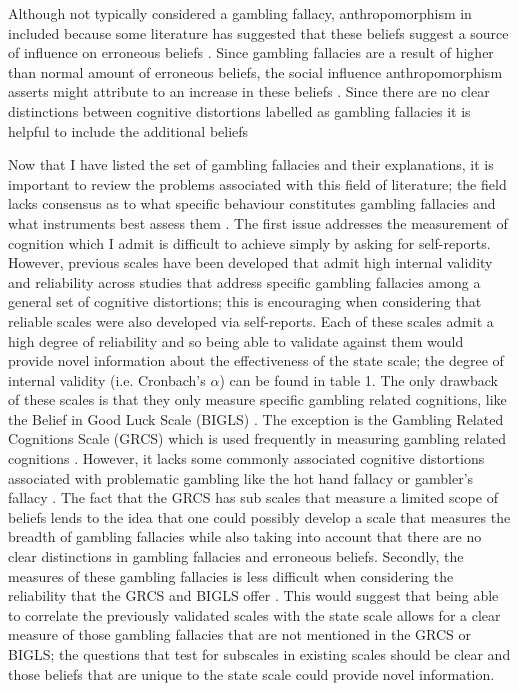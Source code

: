 \documentclass[twoside,twocolumn]{article}
\begin{document}
Although not typically considered a gambling fallacy, anthropomorphism in included because some literature has suggested that these beliefs suggest a source of influence on erroneous beliefs \cite{wyatz:2010}. Since gambling fallacies are a result of higher than normal amount of erroneous beliefs, the social influence anthropomorphism asserts might attribute to an increase in these beliefs \cite{wyatz:2010}. Since there are no clear distinctions between cognitive distortions labelled as gambling fallacies it is helpful to include the additional beliefs \cite{Leonard:2015}

Now that I have listed the set of gambling fallacies and their explanations, it is important to review the problems associated with this field of literature; the field lacks consensus as to what specific behaviour constitutes gambling fallacies and what instruments best assess them \cite{Leonard:2015}. The first issue addresses the measurement of cognition which I admit is difficult to achieve simply by asking for self-reports. However, previous scales have been developed that admit high internal validity and reliability across studies that address specific gambling fallacies among a general set of cognitive distortions; this is encouraging when considering that reliable scales were also developed via self-reports\cite{Leonard:2015, Ladouceur:2004,raylu:2004, darke:1997, wyatz:2010}. Each of these scales admit a high degree of reliability and so being able to validate against them would provide novel information about the effectiveness of the state scale; the degree of internal validity (i.e. Cronbach's $\alpha$) can be found in table 1. The only drawback of these scales is that they only measure specific gambling related cognitions, like the Belief in Good Luck Scale (BIGLS) \cite{Leonard:2015}. The exception is the Gambling Related Cognitions Scale (GRCS) which is used frequently in measuring gambling related cognitions \cite{gabriel}. However, it lacks some commonly associated cognitive distortions associated with problematic gambling like the hot hand fallacy or gambler's fallacy \cite{raylu:2004}. The fact that the GRCS has sub scales that measure a limited scope of beliefs lends to the idea that one could possibly develop a scale that measures the breadth of gambling fallacies while also taking into account that there are no clear distinctions in gambling fallacies and erroneous beliefs. Secondly, the measures of these gambling fallacies is less difficult when considering the reliability that the GRCS and BIGLS offer \cite{Leonard:2015}. This would suggest that being able to correlate the previously validated scales with the state scale allows for a clear measure of those gambling fallacies that are not mentioned in the GRCS or BIGLS; the questions that test for subscales in existing scales should be clear and those beliefs that are unique to the state scale could provide novel information.
\end{document}

